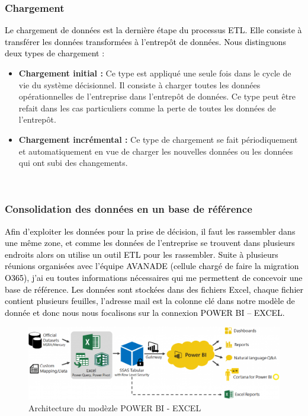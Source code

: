 \documentclass[a4paper,12pt]{report}
\begin{document}
\subsubsection*{Chargement}

\textcolor{black}{
Le chargement de données est la dernière étape du processus ETL. Elle consiste à transférer les données transformées à l’entrepôt de données. }
\textcolor{black}{
Nous distinguons deux types de chargement :}

\begin{itemize}
	\item \textbf{Chargement initial :} Ce type est appliqué une seule fois dans le cycle de vie du système décisionnel. Il consiste à charger toutes les données opérationnelles de l’entreprise dans l’entrepôt de données. Ce type peut être refait dans les cas particuliers comme la perte de toutes les données de l’entrepôt.

    \item \textbf{Chargement incrémental :} Ce type de chargement se fait périodiquement et automatiquement en vue de charger les nouvelles données ou les données qui ont subi des changements.
\end{itemize}

~~\\

\subsubsection{Consolidation des données en un base de référence }
\textcolor{black}{Afin d’exploiter les données pour la prise de décision, il faut les rassembler dans une même zone, et comme les données de l’entreprise se trouvent dans plusieurs endroits alors on utilise un outil ETL pour les rassembler.}
\textcolor{black}{Suite à plusieurs réunions organisées avec l’équipe AVANADE (cellule chargé de faire la migration O365), j’ai eu toutes informations nécessaires qui me permettent de concevoir une base de référence.}
\textcolor{black}{Les données sont stockées dans des fichiers Excel, chaque fichier contient plusieurs feuilles, l’adresse mail est la colonne clé dans notre modèle de donnée et donc nous nous focalisons sur la connexion POWER BI – EXCEL.}


\begin{figure}[H]
	\begin{center}
		\includegraphics[width=0.8\linewidth]{Projet_O365/archi_bi_excel}
\end{center}
	\caption{Architecture du modèzle POWER BI - EXCEL}
	\label{fig:13}	
\end{figure}
\end{document}
